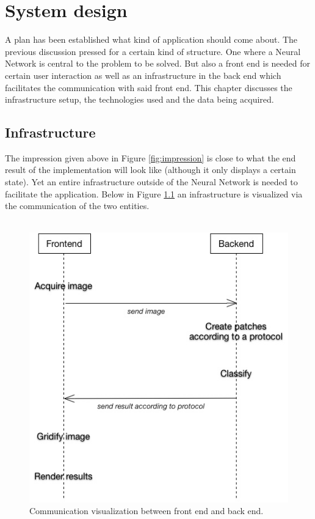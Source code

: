 \documentclass[a4paper,onecolumn]{report}
\begin{document}
\chapter{System design}
\label{chap:softwarearchitecture}
A plan has been established what kind of application should come about. The previous discussion pressed for a certain kind of structure. One where a Neural Network is central to the problem to be solved. But also a front end is needed for certain user interaction as well as an infrastructure in the back end which facilitates the communication with said front end. This chapter discusses the infrastructure setup, the technologies used and the data being acquired.

\section{Infrastructure}
The impression given above in Figure \ref{fig:impression} is close to what the end result of the implementation will look like (although it only displays a certain state). Yet an entire infrastructure outside of the Neural Network is needed to facilitate the application. Below in Figure \ref{fig:communication} an infrastructure is visualized via the communication of the two entities.
\\\\
\begin{figure}[h!]
    \centering
    \includegraphics[scale=0.5]{./images/communication2.jpg}
    \caption{Communication visualization between front end and back end.}
	\label{fig:communication}
\end{figure}
\end{document}
